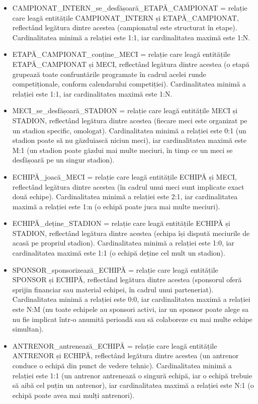 \documentclass{article}
\begin{document}
\begin{itemize}
	\item CAMPIONAT\_INTERN\_se\_desfășoară\_ETAPĂ\_CAMPIONAT = relație care leagă entitățile CAMPIONAT\_INTERN și ETAPĂ\_CAMPIONAT, reflectând legătura dintre acestea (campionatul este structurat în etape). Cardinalitatea minimă a relației este 1:1, iar cardinalitatea maximă este 1:N.
	
	\item ETAPĂ\_CAMPIONAT\_conține\_MECI = relație care leagă entitățile ETAPĂ\_CAMPIONAT și MECI, reflectând legătura dintre acestea (o etapă grupează toate confruntările programate în cadrul acelei runde competiționale, conform calendarului competiției). Cardinalitatea minimă a relației este 1:1, iar cardinalitatea maximă este 1:N.
	
	\item MECI\_se\_desfășoară\_STADION = relație care leagă entitățile MECI și STADION, reflectând legătura dintre acestea (fiecare meci este organizat pe un stadion specific, omologat). Cardinalitatea minimă a relației este 0:1 (un stadion poate să nu găzduiască niciun meci), iar cardinalitatea maximă este M:1 (un stadion poate găzdui mai multe meciuri, în timp ce un meci se desfășoară pe un singur stadion).
	
	\item ECHIPĂ\_joacă\_MECI = relație care leagă entitățile ECHIPĂ și MECI, reflectând legătura dintre acestea (în cadrul unui meci sunt implicate exact două echipe). Cardinalitatea minimă a relației este 2:1, iar cardinalitatea maximă a relației este 1:n (o echipă poate juca mai multe meciuri).
	
	\item ECHIPĂ\_deține\_STADION = relație care leagă entitățile ECHIPĂ și STADION, reflectând legătura dintre acestea (echipa își dispută meciurile de acasă pe propriul stadion). Cardinalitatea minimă a relației este 1:0, iar cardinalitatea maximă este 1:1 (o echipă deține cel mult un stadion).
	
	\item SPONSOR\_sponsorizează\_ECHIPĂ = relație care leagă entitățile SPONSOR și ECHIPĂ, reflectând legătura dintre acestea (sponsorul oferă sprijin financiar sau material echipei, în cadrul unui parteneriat). Cardinalitatea minimă a relației este 0:0, iar cardinalitatea maximă a relației este N:M (nu toate echipele au sponsori activi, iar un sponsor poate alege sa nu fie implicat într-o anumită perioadă sau să colaboreze cu mai multe echipe simultan).
	
	\item ANTRENOR\_antrenează\_ECHIPĂ = relație care leagă entitățile ANTRENOR și ECHIPĂ, reflectând legătura dintre acestea (un antrenor conduce o echipă din punct de vedere tehnic). Cardinalitatea minimă a relației este 1:1 (un antrenor antrenează o singură echipă, iar o echipă trebuie să aibă cel puțin un antrenor), iar cardinalitatea maximă a relației este N:1 (o echipă poate avea mai mulți antrenori).
	

\end{itemize}
\end{document}
